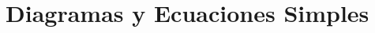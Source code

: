 \documentclass{book}
\begin{document}

\tableofcontents

\chapter{Diagramas y Ecuaciones Simples}

\end{document}
